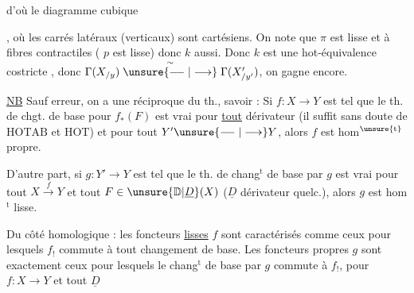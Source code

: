 
d'où le diagramme cubique


, où les  carrés latéraux (verticaux) sont cartésiens. On note que $\pi$ est lisse et à fibres contractiles ( $p$ est lisse) donc $k$ aussi.  Donc $k$ est une hot-équivalence    \unsure{$=$} costricte , donc $\Gamma(X_{/y})\mathrel{\overset{\sim}{\unsure{\relbar\joinrel\relbar|\longrightarrow}}}\Gamma(X'_{/y'})$, on gagne encore.

\uline{NB} Sauf erreur, on a une réciproque du th., savoir : Si $f:X\longrightarrow Y$ est tel que le th. de chgt. de base pour $f_*(F)$ est vrai pour \uline{tout} dérivateur (il suffit sans doute de $\mathrm{HOTAB}$ et $\mathrm{HOT}$) et pour tout $Y'\unsure{\relbar\joinrel\relbar|\longrightarrow}Y$, alors $f$ est hom$^{\unsure{\mathrm t}}$ propre.

D'autre part, si $g:Y'\longrightarrow Y$ est tel que le th. de chang$^{\mathrm t}$ de base par $g$ est vrai pour tout $X\xrightarrow{f}Y$ et tout $F\in\unsure{\mathbb D|\underline D}(X)$ ($\underline D$ dérivateur  quelc.), alors $g$ est hom$^{\mathrm t}$ lisse.

Du côté homologique : les foncteurs \uline{lisses} $f$ sont caractérisés comme ceux pour lesquels  $f_!$ commute à tout changement de base. Les foncteurs propres $g$ sont exactement ceux pour lesquels le chang$^{\mathrm t}$ de base par $g$ commute à $f_!$, pour   $f:X\longrightarrow Y$ et tout $\underline D$ 
